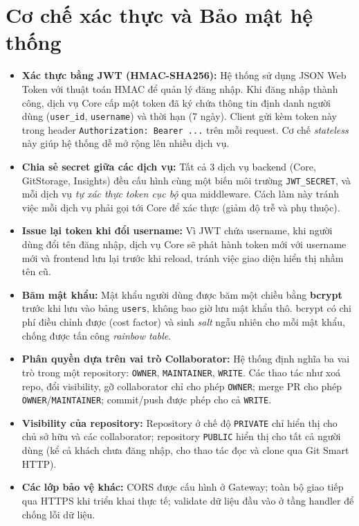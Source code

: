 \section{Cơ chế xác thực và Bảo mật hệ thống}
\begin{itemize}
\item \textbf{Xác thực bằng JWT (HMAC-SHA256):} Hệ thống sử dụng JSON Web Token với thuật toán HMAC để quản lý đăng nhập. Khi đăng nhập thành công, dịch vụ Core cấp một token đã ký chứa thông tin định danh người dùng (\texttt{user\_id}, \texttt{username}) và thời hạn (7 ngày). Client gửi kèm token này trong header \texttt{Authorization: Bearer ...} trên mỗi request. Cơ chế \textit{stateless} này giúp hệ thống dễ mở rộng lên nhiều dịch vụ.
\item \textbf{Chia sẻ secret giữa các dịch vụ:} Tất cả 3 dịch vụ backend (Core, GitStorage, Insights) đều cấu hình cùng một biến môi trường \texttt{JWT\_SECRET}, và mỗi dịch vụ \textit{tự xác thực token cục bộ} qua middleware. Cách làm này tránh việc mỗi dịch vụ phải gọi tới Core để xác thực (giảm độ trễ và phụ thuộc).
\item \textbf{Issue lại token khi đổi username:} Vì JWT chứa username, khi người dùng đổi tên đăng nhập, dịch vụ Core sẽ phát hành token mới với username mới và frontend lưu lại trước khi reload, tránh việc giao diện hiển thị nhầm tên cũ.
\item \textbf{Băm mật khẩu:} Mật khẩu người dùng được băm một chiều bằng \textbf{bcrypt} trước khi lưu vào bảng \texttt{users}, không bao giờ lưu mật khẩu thô. bcrypt có chi phí điều chỉnh được (cost factor) và sinh \textit{salt} ngẫu nhiên cho mỗi mật khẩu, chống được tấn công \textit{rainbow table}.
\item \textbf{Phân quyền dựa trên vai trò Collaborator:} Hệ thống định nghĩa ba vai trò trong một repository: \texttt{OWNER}, \texttt{MAINTAINER}, \texttt{WRITE}. Các thao tác như xoá repo, đổi visibility, gỡ collaborator chỉ cho phép \texttt{OWNER}; merge PR cho phép \texttt{OWNER}/\texttt{MAINTAINER}; commit/push được phép cho cả \texttt{WRITE}.
\item \textbf{Visibility của repository:} Repository ở chế độ \texttt{PRIVATE} chỉ hiển thị cho chủ sở hữu và các collaborator; repository \texttt{PUBLIC} hiển thị cho tất cả người dùng (kể cả khách chưa đăng nhập, cho thao tác đọc và clone qua Git Smart HTTP).
\item \textbf{Các lớp bảo vệ khác:} CORS được cấu hình ở Gateway; toàn bộ giao tiếp qua HTTPS khi triển khai thực tế; validate dữ liệu đầu vào ở tầng handler để chống lỗi dữ liệu.
\end{itemize}
